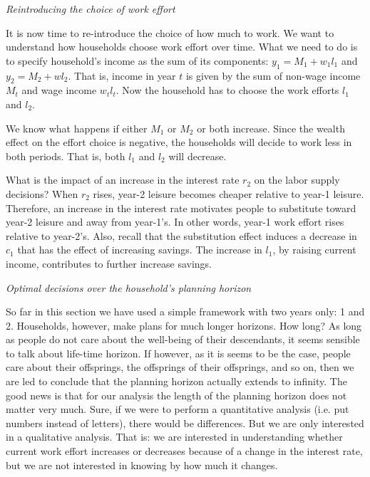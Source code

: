 \documentclass[letterpaper,12pt]{article}
\begin{document}
\textit{Reintroducing the choice of work effort}

It is now time to re-introduce the choice of how much to work. We
want to understand how households choose work effort over time.
What we need to do is to specify household's income as the sum of
its components: $y_{1}=M_{1}+w_{1}l_{1}$ and $y_{2}=M_{2}+wl_{2}$.
That is, income in year $t$ is given by the sum of non-wage income
$M_{t}$ and wage income $w_{t}l_{t}$. Now the household has to
choose the work efforts $l_{1}$ and $l_{2}$.

We know what happens if either $M_{1}$ or $M_{2}$ or both
increase. Since the wealth effect on the effort choice is
negative, the households will decide to work less in both periods.
That is, both $l_{1}$ and $l_{2}$ will decrease.

What is the impact of an increase in the interest rate $r_{2}$ on
the labor supply decisions? When $r_{2}$ rises, year-2 leisure
becomes cheaper relative to year-1 leisure. Therefore, an increase
in the interest rate motivates people to substitute toward year-2
leisure and away from year-1's. In other words, year-1 work effort
rises relative to year-2's. Also, recall that the substitution
effect induces a decrease in $c_{1}$ that has the effect of
increasing savings. The increase in $l_{1}$, by raising current
income, contributes to further increase savings.

\textit{Optimal decisions over the household's planning horizon}

So far in this section we have used a simple framework with two
years only: 1 and 2. Households, however, make plans for much
longer horizons. How long? As long as people do not care about the
well-being of their descendants, it seems sensible to talk about
life-time horizon. If however, as it is seems to be the case,
people care about their offsprings, the offsprings of their
offsprings, and so on, then we are led to conclude that the
planning horizon actually extends to infinity. The good news is
that for our analysis the length of the planning horizon does not
matter very much. Sure, if we were to perform a quantitative
analysis (i.e. put numbers instead of letters), there would be
differences. But we are only interested in a qualitative analysis.
That is: we are interested in understanding whether current work
effort increases or decreases because of a change in the interest
rate, but we are not interested in knowing by how much it changes.
\end{document}
